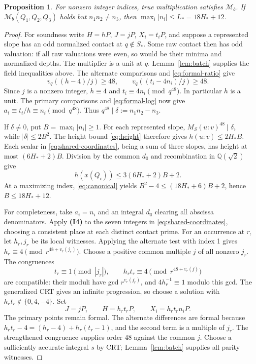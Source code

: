 \documentclass[11pt]{article}
\newtheorem{proposition}[theorem]{Proposition}
\theoremstyle{definition}
\newcommand{\Q}{\mathbb Q}\newcommand{\Z}{\mathbb Z}
\begin{document}
\begin{proposition}\label{prop:batched-error}
For nonzero integer indices, true multiplication satisfies
\(\mathcal M_b\). If \(\mathcal M_b(Q_1,Q_2,Q_3)\) holds but \(n_1n_2\ne n_3\), then
\(\max_i|n_i|\le L_*=18H_*+12\).
\end{proposition}
\begin{proof}
For soundness write \(H=hP\), \(J=jP\), \(X_i=t_iP\),
and suppose a represented slope has an odd normalized contact at
\(q\notin S_*\). Some raw contact then has odd valuation:
if all raw valuations were even, so would be their minima and
normalized depths. The multiplier is a unit at \(q\).
Lemma~\ref{lem:batch} supplies the field inequalities above.
The alternate comparisons and \eqref{eq:formal-ratio} give
\[
 v_q((h-4)/j)\ge48,\qquad v_q((t_i-4n_i)/j)\ge48.
\]
Since \(j\) is a nonzero integer, \(h\equiv4\) and
\(t_i\equiv4n_i\pmod{q^{48}}\). In particular \(h\) is a
unit. The primary comparisons and \eqref{eq:formal-log} now give
\(a_i\equiv t_i/h\equiv n_i\pmod{q^{48}}\).
Thus \(q^{48}\mid\delta:=n_1n_2-n_3\).

If \(\delta\ne0\), put \(B=\max_i|n_i|\ge1\).
For each represented slope, \(M_S(u:v)^{48}\mid\delta\),
while \(|\delta|\le2B^2\). The height bound \eqref{eq:height}
therefore gives \(h(u:v)\le2H_*B\). Each scalar in
\eqref{eq:shared-coordinates}, being a sum of three slopes, has
height at most \((6H_*+2)B\). Division by the common \(d_0\)
and recombination in \(\Q(\sqrt2)\) give
\[
 h(x(Q_i))\le3(6H_*+2)B+2.
\]
At a maximizing index, \eqref{eq:canonical} yields
\(B^2-4\le(18H_*+6)B+2\), hence \(B\le18H_*+12\).

For completeness, take \(a_i=n_i\) and an integral \(d_0\)
clearing all abscissa denominators. Apply \textbf{(I4)} to the seven
integers in \eqref{eq:shared-coordinates}, choosing a consistent
place at each distinct contact prime. For an occurrence at \(r\),
let \(h_r,j_r\) be its local witnesses. Applying the alternate
test with index 1 gives
\(h_r\equiv4\pmod{r^{48+v_r(j_r)}}\).
Choose a positive common multiple \(j\) of all nonzero \(j_r\).
The congruences
\[
 t_r\equiv1\pmod{|j_r|},\qquad
 h_rt_r\equiv4\pmod{r^{48+v_r(j)}}
\]
are compatible: their moduli have gcd \(r^{v_r(j_r)}\), and
\(4h_r^{-1}\equiv1\) modulo this gcd. The generalized CRT
gives an infinite progression, so choose a solution with
\(h_rt_r\notin\{0,4,-4\}\). Set
\[
 J=jP,\qquad H=h_rt_rP,\qquad X_i=h_rt_rn_iP.
\]
The primary points remain formal. The alternate differences are
formal because
\(h_rt_r-4=(h_r-4)+h_r(t_r-1)\), and the second term is a
multiple of \(j_r\). The strengthened congruence supplies order
48 against the common \(j\). Choose a sufficiently accurate integral
\(s\) by CRT; Lemma~\ref{lem:batch} supplies all parity witnesses.


\end{proof}
\end{document}
